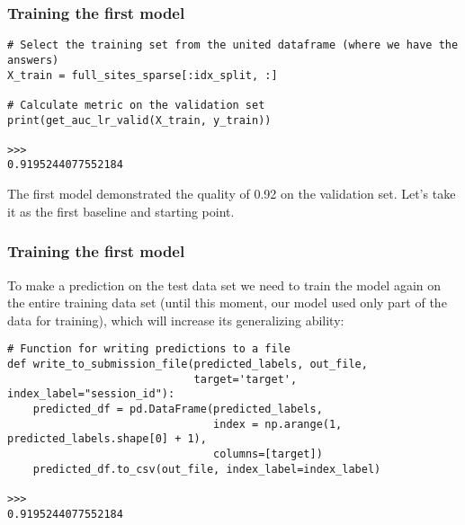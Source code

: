 \begin{frame}[fragile]\frametitle{Training the first model}	
\begin{lstlisting}
# Select the training set from the united dataframe (where we have the answers)
X_train = full_sites_sparse[:idx_split, :]

# Calculate metric on the validation set
print(get_auc_lr_valid(X_train, y_train))

>>>
0.9195244077552184
\end{lstlisting}

The first model demonstrated the quality of 0.92 on the validation set. Let's take it as the first baseline and starting point.
\end{frame}


\begin{frame}[fragile]\frametitle{Training the first model}	

To make a prediction on the test data set we need to train the model again on the entire training data set (until this moment, our model used only part of the data for training), which will increase its generalizing ability:

\begin{lstlisting}
# Function for writing predictions to a file
def write_to_submission_file(predicted_labels, out_file,
                             target='target', index_label="session_id"):
    predicted_df = pd.DataFrame(predicted_labels,
                                index = np.arange(1, predicted_labels.shape[0] + 1),
                                columns=[target])
    predicted_df.to_csv(out_file, index_label=index_label)

>>>
0.9195244077552184
\end{lstlisting}

\end{frame}


